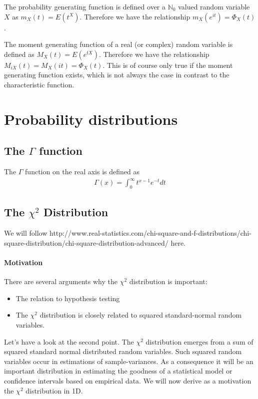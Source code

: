 \documentclass[10pt,a4paper]{article}
\begin{document}
The probability generating function is defined over a $\mathbb N _0$ valued random variable $X$ as $m_X(t) = E(t^X)$. Therefore we have the relationship $m_X(e^{it})=\Phi_X(t) $.

The moment generating function of a real (or complex) random variable is defined as  $M_X(t) = E(e^{tX})$. Therefore we have the relationship $M_{iX}(t)=M_X(it)=\Phi_X(t)$. This is of course only true if the moment generating function exists, which is not always the case in contrast to the characteristic function.
\section{Probability distributions}
\subsection{The $\Gamma$ function}
The $\Gamma$ function on the real axis is defined as 
\begin{align}
\Gamma(x) = \int_0^\infty t^{x-1} e^{-t} dt
\end{align}
\subsection{The $\chi^2$ Distribution}
We will follow http://www.real-statistics.com/chi-square-and-f-distributions/chi-square-distribution/chi-square-distribution-advanced/ here.

\paragraph*{Motivation}
There are several arguments why the $\chi^2$ distribution is important:
\begin{itemize}
\item The relation to   hypothesis testing 
\item The $\chi^2$ distribution is closely related to squared standard-normal random variables.
\end{itemize}

Let's have a look at the second point. The $\chi^2$ distribution emerges from a sum of squared standard normal distributed random variables. Such squared random variables occur in estimations of sample-variances. As a consequence it will be an important distribution in estimating the goodness of a statistical model or confidence intervals based on empirical data. We will now derive as a motivation the  $\chi^2$ distribution in 1D.
\end{document}
